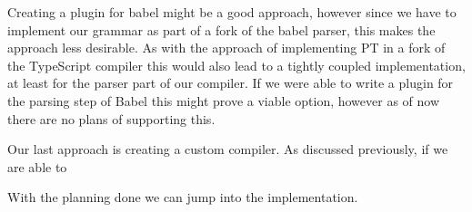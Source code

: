 Creating a plugin for babel might be a good approach, however since we have to implement our grammar as part of a fork of the babel parser, this makes the approach less desirable.
As with the approach of implementing PT in a fork of the TypeScript compiler this would also lead to a tightly coupled implementation, at least for the parser part of our compiler.
If we were able to write a plugin for the parsing step of Babel this might prove a viable option, however as of now there are no plans of supporting this.

Our last approach is creating a custom compiler.
As discussed previously, if we are able to %

With the planning done we can jump into the implementation.